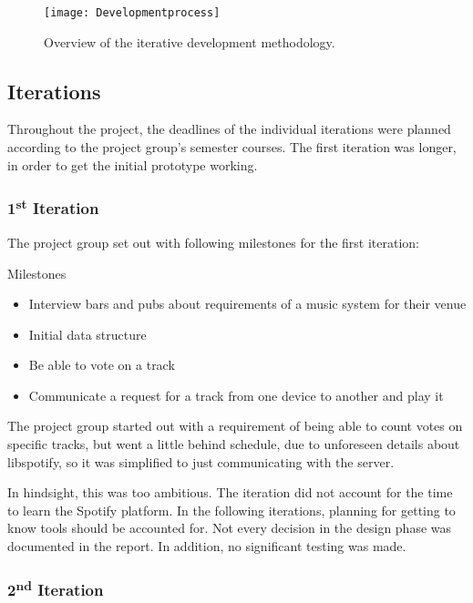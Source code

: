 \begin{figure}[hbtp]
  \centering
  \texttt{[image: Developmentprocess]}
  \caption{Overview of the iterative development methodology.}\label{fig:developmentprocess}
\end{figure}

\subsection{Iterations}

Throughout the project, the deadlines of the individual iterations were planned according to the project group's semester courses. The first iteration was longer, in order to get the initial prototype working.

\subsubsection{1\textsuperscript{st} Iteration}

The project group set out with following milestones for the first iteration:

Milestones
\begin{itemize}
        \item Interview bars and pubs about requirements of a music system for their venue
        \item Initial data structure
        \item Be able to vote on a track
        \item Communicate a request for a track from one device to another and play it
\end{itemize}

The project group started out with a requirement of being able to count votes on specific tracks, but went a little behind schedule, due to unforeseen details about libspotify, so it was simplified to just communicating with the server.

In hindsight, this was too ambitious. The iteration did not account
for the time to learn the Spotify platform. In the following iterations, planning for getting to know tools should be accounted for. Not every decision in the design phase was documented in the report. In addition, no significant testing was made.

\subsubsection{2\textsuperscript{nd} Iteration}

